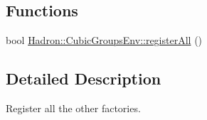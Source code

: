 \subsection*{Functions}
\begin{DoxyCompactItemize}
\item 
bool \mbox{\hyperlink{namespaceHadron_1_1CubicGroupsEnv_a72c88213059f1ce4ac24ef0b5032307b}{Hadron\+::\+Cubic\+Groups\+Env\+::register\+All}} ()
\end{DoxyCompactItemize}


\subsection{Detailed Description}
Register all the other factories. 

